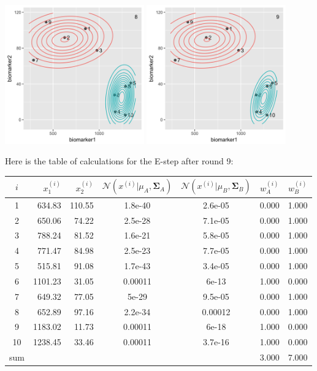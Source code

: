 \begin{enumerate}
\begin{center}
\includegraphics[width=0.45\textwidth]{img/biomarker-data-labels-8.png}
\includegraphics[width=0.45\textwidth]{img/biomarker-data-labels-9.png}
\end{center}

\end{enumerate}

\noindent Here is the table of calculations for the E-step after round 9:
\begin{center}
\small
\begin{tabular}{crrcccc}
\toprule
$i$ & $x_1^{(i)}$ & $x_2^{(i)}$ & $\mathcal{N}(x^{(i)}| \mu_A, \boldsymbol\Sigma_A)$ & $\mathcal{N}(x^{(i)}|\mu_B, \boldsymbol\Sigma_B)$ & $w_A^{(i)}$ & $w_B^{(i)}$ \\
\midrule
1 & 634.83 & 110.55 & 1.8e-40 & 2.6e-05 & 0.000 & 1.000 \\ 
  2 & 650.06 & 74.22 & 2.5e-28 & 7.1e-05 & 0.000 & 1.000 \\ 
  3 & 788.24 & 81.52 & 1.6e-21 & 5.8e-05 & 0.000 & 1.000 \\ 
  4 & 771.47 & 84.98 & 2.5e-23 & 7.7e-05 & 0.000 & 1.000 \\ 
  5 & 515.81 & 91.08 & 1.7e-43 & 3.4e-05 & 0.000 & 1.000 \\ 
  6 & 1101.23 & 31.05 & 0.00011 & 6e-13 & 1.000 & 0.000 \\ 
  7 & 649.32 & 77.05 & 5e-29 & 9.5e-05 & 0.000 & 1.000 \\ 
  8 & 652.89 & 97.16 & 2.2e-34 & 0.00012 & 0.000 & 1.000 \\ 
  9 & 1183.02 & 11.73 & 0.00011 & 6e-18 & 1.000 & 0.000 \\ 
  10 & 1238.45 & 33.46 & 0.00011 & 3.7e-16 & 1.000 & 0.000 \\   
\midrule
sum & & & & & 3.000 & 7.000 \\
\bottomrule
\end{tabular}
\end{center}

